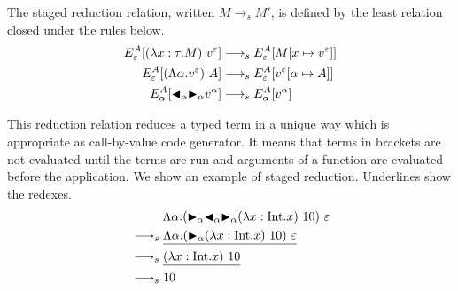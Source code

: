 \begin{definition}
    The staged reduction relation, written $M \longrightarrow_s M'$, is defined by
    the least relation closed under the rules below.
    \begin{align*}
        E^A_\varepsilon [(\lambda x:\tau.M)\ v^\varepsilon] & \longrightarrow_s E^A_\varepsilon[M[x\mapsto v^\varepsilon]]      \\
        E^A_\varepsilon [(\Lambda\alpha.v^\varepsilon)\ A]  & \longrightarrow_s E^A_\varepsilon[v^\varepsilon[\alpha\mapsto A]] \\
        E^A_\alpha [{\mathop{\blacktriangleleft}}_\alpha {\mathop{\blacktriangleright}}_\alpha v^\alpha]        & \longrightarrow_s E^A_\alpha[v^\alpha]                            \\
    \end{align*}
\end{definition}

This reduction relation reduces a typed term in a unique way
which is appropriate as call-by-value code generator.
It means that terms in brackets are not evaluated until the terms are run
and arguments of a function are evaluated before the application.
We show an example of staged reduction.
Underlines show the redexes.
\begin{align*}
     & \hspace{9mm} \Lambda\alpha.(\TB_\alpha \underline{\TBL_\alpha \TB_\alpha} (\lambda x:\I.x)\ 10)\ \varepsilon \\
     & \longrightarrow_s \underline{\Lambda\alpha.(\TB_\alpha (\lambda x:\I.x)\ 10)\ \varepsilon}                   \\
     & \longrightarrow_s \underline{(\lambda x:\I.x)\ 10}                                                           \\
     & \longrightarrow_s 10
\end{align*}